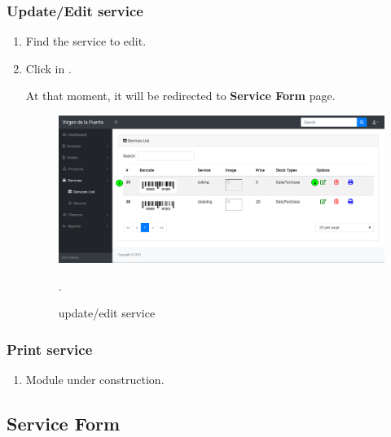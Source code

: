 \documentclass[a4paper,11pt]{refart}
\newcommand\InConstruction{\color{red} Module under construction.}
\begin{document}
\subsubsection{Update/Edit service}
\begin{enumerate}
	\item Find the service to edit.
	\item Click in .
	\medskip
	\begin{leftbar}
		At that moment, it will be redirected to \textbf{Service Form} page.
	\end{leftbar}
	\begin{figure}[H]\centering
		\includegraphics[width=\textwidth]{images/service_list-update.png}
		\caption{update/edit service}
		\label{fig:service_list-update.png}.
	\end{figure}
\end{enumerate}

\subsubsection{Print service}
\begin{enumerate}
	\item \InConstruction{}
\end{enumerate}

\subsection{Service Form}\label{section:service_form}
\end{document}
